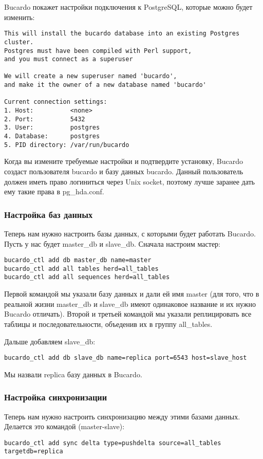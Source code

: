 Bucardo покажет настройки подключения к PostgreSQL, которые можно будет изменить:
\begin{lstlisting}[label=lst:bucardo6,caption=Инициализация Bucardo]
This will install the bucardo database into an existing Postgres cluster.
Postgres must have been compiled with Perl support,
and you must connect as a superuser

We will create a new superuser named 'bucardo',
and make it the owner of a new database named 'bucardo'

Current connection settings:
1. Host:          <none>
2. Port:          5432
3. User:          postgres
4. Database:      postgres
5. PID directory: /var/run/bucardo
\end{lstlisting}

Когда вы измените требуемые настройки и подтвердите установку, Bucardo создаст пользователя bucardo и базу данных bucardo.
Данный пользователь должен иметь право логиниться через Unix socket, поэтому лучше заранее дать ему такие права в pg\_hda.conf.

\subsubsection{Настройка баз данных}
Теперь нам нужно настроить базы данных, с которыми будет работать Bucardo.
Пусть у нас будет master\_db и slave\_db. Сначала настроим мастер:
\begin{lstlisting}[label=lst:bucardo7,caption=Настройка баз данных]
bucardo_ctl add db master_db name=master
bucardo_ctl add all tables herd=all_tables
bucardo_ctl add all sequences herd=all_tables
\end{lstlisting}

Первой командой мы указали базу данных и дали ей имя master (для того, что в реальной жизни master\_db и slave\_db
имеют одинаковое название и их нужно Bucardo отличать). Второй и третьей командой мы указали реплицировать все таблицы и последовательности, объеденив их в группу all\_tables.

Дальше добавляем slave\_db:
\begin{lstlisting}[label=lst:bucardo8,caption=Настройка баз данных]
bucardo_ctl add db slave_db name=replica port=6543 host=slave_host
\end{lstlisting}

Мы назвали replica базу данных в Bucardo.

\subsubsection{Настройка синхронизации}
Теперь нам нужно настроить синхронизацию между этими базами данных. Делается это командой (master-slave):
\begin{lstlisting}[label=lst:bucardo9,caption=Настройка синхронизации]
bucardo_ctl add sync delta type=pushdelta source=all_tables targetdb=replica
\end{lstlisting}

